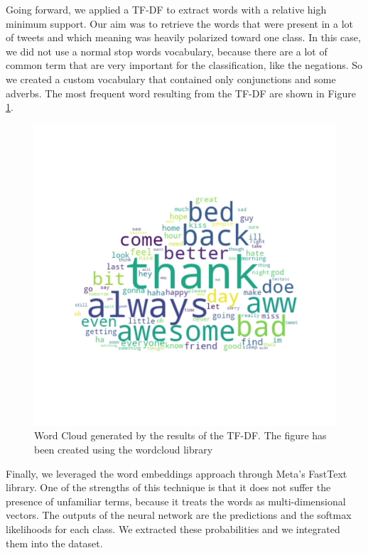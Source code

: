 \documentclass[conference]{IEEEtran}
\begin{document}
Going forward, we applied a TF-DF to extract words with a relative high minimum support. Our aim was to retrieve the words that were present in a lot of tweets and which meaning was heavily polarized toward one class. In this case, we did not use a normal stop words vocabulary, because there are a lot of common term that are very important for the classification, like the negations. So we created a custom vocabulary that contained only conjunctions and some adverbs. The most frequent word resulting from the TF-DF are shown in Figure \ref{fig:word_cloud}.
\begin{figure}[h]
        \centering
        \includegraphics[width=\columnwidth]{word_cloud}
        \caption{Word Cloud generated by the results of the TF-DF. The figure has been created using the wordcloud library\cite{word_cloud}}
        \label{fig:word_cloud}
\end{figure}

Finally, we leveraged the word embeddings approach through Meta's FastText library. %
One of the strengths of this technique is that it does not suffer the presence of unfamiliar terms, because it treats the words as multi-dimensional vectors. The outputs of the neural network are the predictions and the softmax likelihoods for each class. We extracted these probabilities and we integrated them into the dataset.
\end{document}
